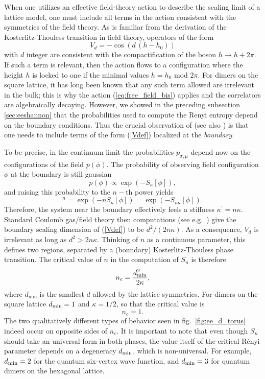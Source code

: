 \documentclass[11pt]{iopart}
\begin{document}
When one utilizes an effective field-theory action to describe the scaling limit of a lattice model, one must include all terms in the action consistent with the symmetries of the field theory. As is familiar from the derivation of the Kosterlitz-Thouless transition in field theory, operators of the form 
\begin{equation}
 V_d=-\cos \left(d \,(h-h_0)\right)
 \label{Vdef}
\end{equation}
with $d$ integer 
are consistent with the compactification  of the boson $h\to h + 2\pi$.
If such a term is relevant, then the action flows to a configuration where the height $h$ is locked to one if the minimal values $h=h_0$ mod $2\pi$. For dimers on the square lattice, it has long been known that any such term allowed are irrelevant in the bulk; this is why the action (\ref{eq:free_field_bis}) applies and the correlators are algebraically decaying. However, we showed in the preceding subsection \ref{sec:eeshannon} that the probabilities used to compute the Renyi entropy depend on the boundary conditions. Thus the crucial observation of \cite{Stephan2011} (see also \cite{Shannonee}) is that one needs to include terms of the form (\ref{Vdef}) localized at the {\em boundary}.

To be precise, in the continuum limit the probabilities $p_{\sigma,\mu}$ depend now on the configurations of the field $p(\phi)$. The probability of observing field configuration $\phi$ at the boundary is still gaussian
\begin{equation}
 p(\phi)\propto \exp(-S_{\kappa}[\phi]),
\end{equation}
and raising this probability to the $n-$th power yields
\begin{equation}
 [p(\phi)]^n=\exp(-n S_{\kappa}[\phi])=\exp(-S_{n\kappa}[\phi]).
\end{equation}
Therefore, the system near the boundary effectively feels a stiffness $\kappa^\prime=n\kappa$. 
Standard Coulomb gas/field theory then computations (see e.g.\ \cite{Nienhuis}) give the boundary scaling dimension of (\ref{Vdef}) to be $d^2/(2n\kappa)$. 
As a consequence, $V_d$ is irrelevant as long as $d^2>2n\kappa$. Thinking of $n$ as a continuous parameter, this defines two regions, separated by a (boundary) Kosterlitz-Thouless phase transition. The critical value of $n$ in the computation of  $S_n$  is therefore
\begin{equation}
 n_c=\frac{d_{\rm min}^2}{2\kappa},
\end{equation}
where $d_{\min}$ is the smallest $d$ allowed by the lattice symmetries. For dimers on the square lattice $d_{\rm min}=1$ and $\kappa=1/2$, so that the critical value is
\begin{equation}
 n_c=1.
\end{equation}
The two qualitatively different types of behavior seen in fig.\ \ref{fig:ee_d_torus} indeed occur on opposite sides of $n_c$. It is important to note that even though $S_n$ should take an universal form in both phases, the value itself of the critical R\'enyi parameter depends on a degeneracy $d_{\rm min}$, which is non-universal. For example, $d_{\rm min}=2$ for the quantum six-vertex wave function, and $d_{\rm min}=3$ for quantum dimers on the hexagonal lattice. 
\end{document}
